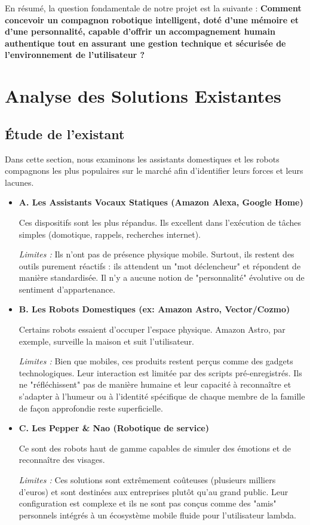 \documentclass[a4paper,12pt]{report}
\newcommand{\sectiontitle}[1]{\needspace{4\baselineskip}\section{#1}}
\newcommand{\subsectiontitle}[1]{\needspace{3\baselineskip}\subsection{#1}}
\begin{document}
	En résumé, la question fondamentale de notre projet est la suivante : \textbf{Comment concevoir un compagnon robotique intelligent, doté d'une mémoire et d'une personnalité, capable d'offrir un accompagnement humain authentique tout en assurant une gestion technique et sécurisée de l'environnement de l'utilisateur ?}
	
	\sectiontitle{Analyse des Solutions Existantes}
	
	\subsectiontitle{Étude de l'existant}
	
	Dans cette section, nous examinons les assistants domestiques et les robots compagnons les plus populaires sur le marché afin d'identifier leurs forces et leurs lacunes.
	
	\begin{itemize}
		\item \textbf{A. Les Assistants Vocaux Statiques (Amazon Alexa, Google Home)}
		
		Ces dispositifs sont les plus répandus. Ils excellent dans l'exécution de tâches simples (domotique, rappels, recherches internet).
		
		\textit{Limites :} Ils n'ont pas de présence physique mobile. Surtout, ils restent des outils purement réactifs : ils attendent un "mot déclencheur" et répondent de manière standardisée. Il n'y a aucune notion de "personnalité" évolutive ou de sentiment d'appartenance.
		
		\item \textbf{B. Les Robots Domestiques (ex: Amazon Astro, Vector/Cozmo)}
		
		Certains robots essaient d'occuper l'espace physique. Amazon Astro, par exemple, surveille la maison et suit l'utilisateur.
		
		\textit{Limites :} Bien que mobiles, ces produits restent perçus comme des gadgets technologiques. Leur interaction est limitée par des scripts pré-enregistrés. Ils ne "réfléchissent" pas de manière humaine et leur capacité à reconnaître et s'adapter à l'humeur ou à l'identité spécifique de chaque membre de la famille de façon approfondie reste superficielle.
		
		\item \textbf{C. Les Pepper \& Nao (Robotique de service)}
		
		Ce sont des robots haut de gamme capables de simuler des émotions et de reconnaître des visages.
		
		\textit{Limites :} Ces solutions sont extrêmement coûteuses (plusieurs milliers d'euros) et sont destinées aux entreprises plutôt qu'au grand public. Leur configuration est complexe et ils ne sont pas conçus comme des "amis" personnels intégrés à un écosystème mobile fluide pour l'utilisateur lambda.
	\end{itemize}
	 
\end{document}
